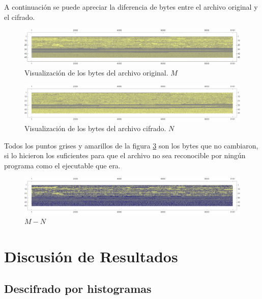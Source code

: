 \documentclass[a4paper]{article}
\begin{document}
A continuación se puede apreciar la diferencia de bytes entre el archivo
original y el cifrado.

\begin{figure}[H]
    \centering
    \includegraphics[width=\textwidth]{gr3d}
    \caption{Visualización de los bytes del archivo
original. $M$}
    \label{fig:DatosOrigM1}
\end{figure}

\begin{figure}[H]
    \centering
    \includegraphics[width=\textwidth]{bytes2}
    \caption{Visualización de los bytes del archivo
cifrado. $N$}
    \label{fig:DatosOrigM2}
\end{figure}

Todos los puntos grises y amarillos de la figura \ref{fig:DatosOrigM3} son los
bytes que no cambiaron, si lo hicieron los suficientes para que el archivo no
sea reconocible por ningún programa como el ejecutable que era.

\begin{figure}[H]
    \centering
    \includegraphics[width=\textwidth]{bytes3}
    \caption{$M-N$}
    \label{fig:DatosOrigM3}
\end{figure}



\newpage
\section{Discusión de Resultados}

\subsection{Descifrado por histogramas}
\end{document}
